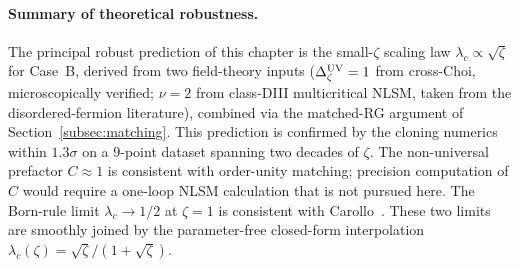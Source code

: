\paragraph{Summary of theoretical robustness.}
The principal robust prediction of this chapter is the small-$\zeta$
scaling law $\lambda_c\propto\sqrt{\zeta}$ for Case~B, derived from
two field-theory inputs ($\Delta_\zeta^{\rm UV}=1$ from
cross-Choi, microscopically verified; $\nu=2$ from class-DIII
multicritical NLSM, taken from the disordered-fermion literature),
combined via the matched-RG argument of
Section~\ref{subsec:matching}.  This prediction is confirmed by the
cloning numerics within $1.3\sigma$ on a $9$-point dataset spanning
two decades of $\zeta$.  The non-universal prefactor $C\approx 1$ is
consistent with order-unity matching; precision computation of $C$
would require a one-loop NLSM calculation that is not pursued here.
The Born-rule limit $\lambda_c\to 1/2$ at $\zeta=1$ is consistent
with Carollo~\cite{Carollo2018PRA}.  These two limits are smoothly
joined by the parameter-free closed-form interpolation
$\lambda_c(\zeta) = \sqrt{\zeta}/(1+\sqrt{\zeta})$.
